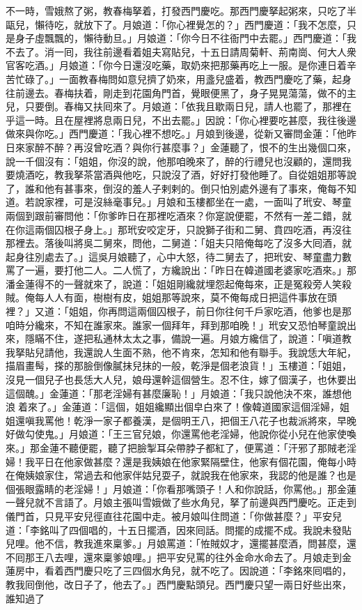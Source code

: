 不一時，雪娥熬了粥，教春梅拏着，打發西門慶吃。那西門慶拏起粥來，只吃了半甌兒，懶待吃，就放下了。月娘道：「你心裡覺怎的？」西門慶道：「我不怎麼，只是身子虛飄飄的，懶待動旦。」{}月娘道：「你今日不往衙門中去罷。」西門慶道：「我不去了。消一囘，我往前邊看着姐夫寫貼兒，十五日請周菊軒、荊南崗、何大人衆官客吃酒。」月娘道：「你今日還沒吃藥，取奶來把那藥再吃上一服。是你連日着辛苦忙碌了。」一面教春梅問如意兒擠了奶來，用盞兒盛着，教西門慶吃了藥，起身往前邊去。春梅扶着，剛走到花園角門首，覺眼便黑了，身子晃晃蕩蕩，做不的主兒，只要倒。春梅又扶囘來了。月娘道：「依我且歇兩日兒，請人也罷了，那裡在乎這一時。且在屋裡將息兩日兒，不出去罷。」因說：「你心裡要吃甚麼，我往後邊做來與你吃。」西門慶道：「我心裡不想吃。」月娘到後邊，從新又審問金蓮：「他昨日來家醉不醉？再沒曾吃酒？與你行甚麼事？」金蓮聽了，恨不的生出幾個口來，說一千個沒有：「姐姐，你沒的說，他那咱晚來了，醉的行禮兒也沒顧的，還問我要燒酒吃，教我拏茶當酒與他吃，只說沒了酒，好好打發他睡了。自從姐姐那等說了，誰和他有甚事來，倒沒的羞人子剌剌的。倒只怕別處外邊有了事來，俺每不知道。若說家裡，可是沒絲毫事兒。」{}月娘和玉樓都坐在一處，一面叫了玳安、琴童兩個到跟前審問他：「你爹昨日在那裡吃酒來？你寔說便罷，不然有一差二錯，就在你這兩個囚根子身上。」那玳安咬定牙，只說獅子街和二舅、賁四吃酒，再沒往那裡去。{}落後叫將吳二舅來，問他，二舅道：「姐夫只陪俺每吃了沒多大囘酒，就起身往別處去了。」這吳月娘聽了，心中大怒，待二舅去了，把玳安、琴童盡力數罵了一遍，要打他二人。二人慌了，方纔說出：「昨日在韓道國老婆家吃酒來。」那潘金蓮得不的一聲就來了，說道：「姐姐剛纔就埋怨起俺每來，正是冤殺旁人笑殺賊。俺每人人有面，樹樹有皮，姐姐那等說來，莫不俺每成日把這件事放在頭裡？」{}又道：「姐姐，你再問這兩個囚根子，前日你往何千戶家吃酒，他爹也是那咱時分纔來，不知在誰家來。誰家一個拜年，拜到那咱晚！」玳安又恐怕琴童說出來，隱瞞不住，遂把私通林太太之事，備說一遍。月娘方纔信了，說道：「嗔道教我拏貼兒請他，我還說人生面不熟，他不肯來，怎知和他有聯手。我說恁大年紀，描眉畫髩，搽的那臉倒像膩抹兒抹的一般，乾淨是個老浪貨！」玉樓道：「姐姐，沒見一個兒子也長恁大人兒，娘母還幹這個營生。忍不住，嫁了個漢子，也休要出這個醜。」金蓮道：「那老淫婦有甚麼廉恥！」月娘道：「我只說他決不來，誰想他浪𢵞着來了。」金蓮道：「這個，姐姐纔顯出個皁白來了！像韓道國家這個淫婦，姐姐還嗔我罵他！乾淨一家子都養漢，是個明王八，把個王八花子也裁派將來，早晚好做勾使鬼。」月娘道：「王三官兒娘，你還罵他老淫婦，他說你從小兒在他家使喚來。」{}那金蓮不聽便罷，聽了把臉掣耳朵帶脖子都紅了，{}{}便罵道：「汗邪了那賊老淫婦！我平日在他家做甚麼？還是我姨娘在他家緊隔壁住，他家有個花園，俺每小時在俺姨娘家住，常過去和他家伴姑兒耍子，就說我在他家來，我認的他是誰？也是個張眼露睛的老淫婦！」月娘道：「你看那嘴頭子！人和你說話，你罵他。」那金蓮一聲兒就不言語了。月娘主張叫雪娥做了些水角兒，拏了前邊與西門慶吃。正走到儀門首，只見平安兒徑直往花園中走。被月娘叫住問道：「你做甚麼？」平安兒道：「李銘叫了四個唱的，十五日擺酒，因來囘話。問擺的成擺不成。我說未發貼兒哩。他不信，教我進來稟爹。」月娘罵道：「恠賊奴才，還擺甚麼酒，問甚麼，還不囘那王八去哩，還來稟爹娘哩。」把平安兒罵的往外金命水命去了。月娘走到金蓮房中，看着西門慶只吃了三四個水角兒，就不吃了。因說道：「李銘來囘唱的，教我囘倒他，改日子了，他去了。」西門慶點頭兒。西門慶只望一兩日好些出來，誰知過了